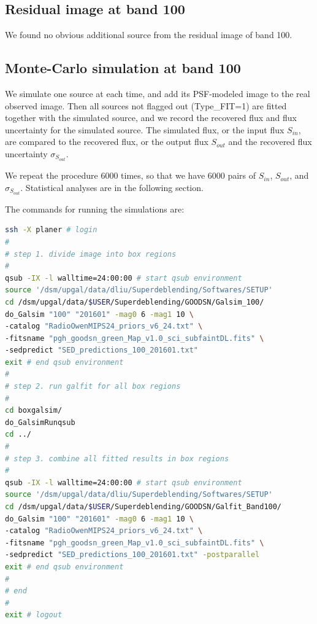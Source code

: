 \documentclass[11pt,a4paper]{article}
\begin{document}
\subsection{Residual image at band 100}
\label{Band100_Galres}

We found no obvious additional source from the residual image of band 100. 

\subsection{Monte-Carlo simulation at band 100}
\label{Band100_Galsim}

We simulate one source at each time, and add its PSF-modeled image to the real observed image. Then all sources not flagged out (Type\_FIT=1) are fitted together with the simulated source, and we record the recovered flux and flux uncertainty for the simulated source. The simulated flux, or the input flux $S_{in}$, are compared to the recovered flux, or the output flux $S_{out}$ and the recovered flux uncertainty $\sigma_{S_{out}}$. 

We repeat the procedure 6000 times, so that we have 6000 pairs of $S_{in}$, $S_{out}$, and $\sigma_{S_{out}}$. Statistical analyses are in the following section. 

The commands for running the simulations are:

\begin{lstlisting}[language=bash]
ssh -X planer # login
# 
# step 1. divide image into box regions
# 
qsub -IX -l walltime=24:00:00 # start qsub environment
source '/dsm/upgal/data/dliu/Superdeblending/Softwares/SETUP'
cd /dsm/upgal/data/$USER/Superdeblending/GOODSN/Galsim_100/
do_Galsim "100" "201601" -mag0 6 -mag1 10 \
-catalog "RadioOwenMIPS24_priors_v6_24.txt" \
-fitsname "pgh_goodsn_green_Map_v1.0_sci_subfaintDL.fits" \
-sedpredict "SED_predictions_100_201601.txt"
exit # end qsub environment
# 
# step 2. run galfit for all box regions
# 
cd boxgalsim/
do_GalsimRunqsub
cd ../
# 
# step 3. combine all fitted results in box regions
# 
qsub -IX -l walltime=24:00:00 # start qsub environment
source '/dsm/upgal/data/dliu/Superdeblending/Softwares/SETUP'
cd /dsm/upgal/data/$USER/Superdeblending/GOODSN/Galfit_Band100/
do_Galsim "100" "201601" -mag0 6 -mag1 10 \
-catalog "RadioOwenMIPS24_priors_v6_24.txt" \
-fitsname "pgh_goodsn_green_Map_v1.0_sci_subfaintDL.fits" \
-sedpredict "SED_predictions_100_201601.txt" -postparallel
exit # end qsub environment
# 
# end
# 
exit # logout
\end{lstlisting}
\end{document}
